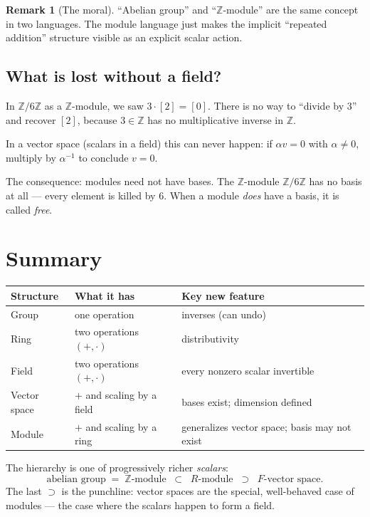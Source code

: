 \documentclass[11pt]{article}
\theoremstyle{definition}
\newtheorem*{rem}{Remark}
\begin{document}
\begin{rem}[The moral]
``Abelian group'' and ``$\mathbb{Z}$-module'' are the same concept in two languages.
The module language just makes the implicit ``repeated addition'' structure visible
as an explicit scalar action.
\end{rem}

\subsection*{What is lost without a field?}

In $\mathbb{Z}/6\mathbb{Z}$ as a $\mathbb{Z}$-module, we saw $3\cdot [2] = [0]$.
There is no way to ``divide by $3$'' and recover $[2]$, because $3\in\mathbb{Z}$
has no multiplicative inverse in $\mathbb{Z}$.

In a vector space (scalars in a field) this can never happen: if $\alpha v = 0$
with $\alpha \neq 0$, multiply by $\alpha^{-1}$ to conclude $v = 0$.

The consequence: modules need not have bases. The $\mathbb{Z}$-module
$\mathbb{Z}/6\mathbb{Z}$ has no basis at all — every element is killed by $6$.
When a module \emph{does} have a basis, it is called \emph{free}.

\section*{Summary}

\begin{center}
\renewcommand{\arraystretch}{1.25}
\begin{tabular}{lll}
\hline
\textbf{Structure} & \textbf{What it has} & \textbf{Key new feature} \\
\hline
Group        & one operation                  & inverses (can undo) \\
Ring         & two operations $(+,\cdot)$     & distributivity \\
Field        & two operations $(+,\cdot)$     & every nonzero scalar invertible \\
Vector space & $+$ and scaling by a field     & bases exist; dimension defined \\
Module       & $+$ and scaling by a ring      & generalizes vector space; basis may not exist \\
\hline
\end{tabular}
\end{center}

\bigskip

The hierarchy is one of progressively richer \emph{scalars}:
\[
\text{abelian group} \;=\; \mathbb{Z}\text{-module}
\;\;\subset\;\; R\text{-module} \;\;\supset\;\; F\text{-vector space}.
\]
The last $\supset$ is the punchline: vector spaces are the special,
well-behaved case of modules — the case where the scalars happen to form
a field.
\end{document}
